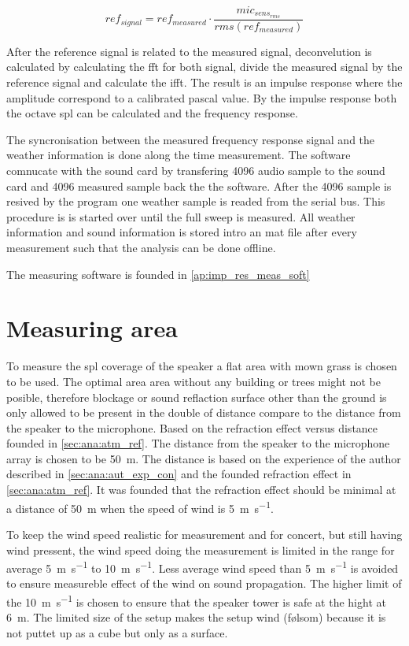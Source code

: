 \begin{equation}\label{eq:relate}
ref_{signal} = ref_{measured} \cdot    \frac{mic_{sens_{rms}}}{rms(ref_{measured})}
\end{equation}

After the reference signal is related to the measured signal, deconvelution is calculated by calculating the \gls{fft} for both signal, divide the measured signal by the reference signal and calculate the \gls{ifft}. The result is an impulse response where the amplitude correspond to a calibrated pascal value. By the impulse response both the octave \gls{spl} can be calculated and the frequency response. 

The syncronisation between the measured frequency response signal and the weather information is done along the time measurement. The \matlab software comnucate with the sound card by transfering 4096 audio sample to the sound card and 4096 measured sample back the the \matlab software. After the 4096 sample is resived by the program one weather sample is readed from the serial bus. This procedure is is started over until the full sweep is measured. All weather information and sound information is stored intro an mat file after every measurement such that the analysis can be done offline.

The measuring software is founded in  \autoref{ap:imp_res_meas_soft}


\section{Measuring area}
To measure the \gls{spl} coverage of the speaker a flat area with mown grass is chosen to be used. The optimal area area without any building or trees might not be posible, therefore blockage or sound reflaction surface other than the ground is only allowed to be present in the double of distance compare to the distance from the speaker to the microphone. Based on the refraction effect versus distance founded in \autoref{sec:ana:atm_ref}. The distance from the speaker to the microphone array is chosen to be \SI{50}{\meter}. The distance is based on the experience of the author described in \autoref{sec:ana:aut_exp_con} and the founded refraction effect in \autoref{sec:ana:atm_ref}. It was founded that the refraction effect should be minimal at a distance of \SI{50}{\meter} when the speed of wind is \SI{5}{\meter\per\second}. 


To keep the wind speed realistic for measurement and for concert, but still having wind pressent, the wind speed doing the measurement is limited in the range for average \SI{5}{\meter\per\second} to \SI{10}{\meter\per\second}. Less average wind speed than \SI{5}{\meter\per\second} is avoided to ensure measureble effect of the wind on sound propagation. The higher limit of the \SI{10}{\meter\per\second} is chosen to ensure that the speaker tower is safe at the hight at \SI{6}{\meter}. The limited size of the setup makes the setup wind (følsom) because it is not puttet up as a cube but only as a surface. 